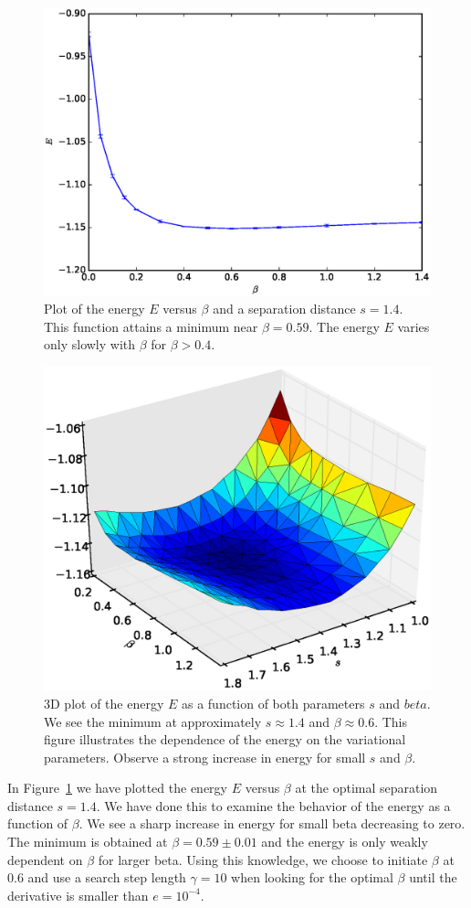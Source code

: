 \documentclass[twoside]{article}
\begin{document}
\begin{figure}[p]
\centering
\includegraphics[width=0.75\linewidth]{figs/EvsBeta.eps}
\caption{Plot of the energy $E$ versus $\beta$ and a separation distance $s=1.4$. This function attains a minimum near $\beta = 0.59$. The energy $E$ varies only slowly with $\beta$ for $\beta>0.4$.}
\label{fig:EvsBeta}
\end{figure}

\begin{figure}[p]
	\centering
	\includegraphics[width=0.75\linewidth]{figs/3dPlot.eps}
	\caption{3D plot of the energy $E$ as a function of both parameters $s$ and $beta$. We see the minimum at approximately $s\approx1.4$ and $\beta \approx 0.6$. This figure illustrates the dependence of the energy on the variational parameters. Observe a strong increase in energy for small $s$ and $\beta$. }
	\label{fig:3dPlot}
\end{figure}

In Figure~\ref{fig:EvsBeta} we have plotted the energy $E$ versus $\beta$ at the optimal separation distance $s = 1.4$. We have done this to examine the behavior of the energy as a function of $\beta$. We see a sharp increase in energy for small beta decreasing to zero. The minimum is obtained at $\beta = 0.59 \pm 0.01$ and the energy is only weakly dependent on $\beta$ for larger beta. Using this knowledge, we choose to initiate $\beta$ at 0.6 and use a search step length $\gamma = 10$ when looking for the optimal $\beta$ until the derivative is smaller than $e = 10^{-4}$.
\end{document}

